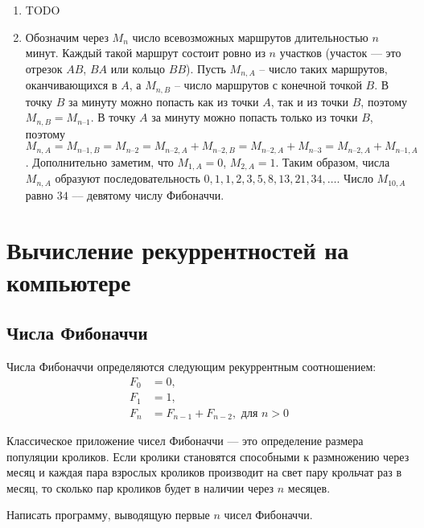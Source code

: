 \documentclass[14pt,openany]{book}
\begin{document}
\begin{enumerate}
\item TODO

\item   Обозначим через $M_n$ число всевозможных маршрутов длительностью $n$ минут. Каждый такой маршрут состоит ровно из $n$ участков (участок –-- это отрезок $AB$, $BA$ или кольцо $BB$). Пусть  $M_{n,A}$ – число таких маршрутов, оканчивающихся в $A$, а $M_{n,B}$ – число маршрутов с конечной точкой $B$.
  В точку $B$ за минуту можно попасть как из точки $A$, так и из точки $B$, поэтому  $M_{n,B} = M_{n–1}$.
  В точку $A$ за минуту можно попасть только из точки $B$, поэтому  $M_{n,A} = M_{n–1,B} = M_{n–2} = M_{n–2,A} + M_{n–2,B} = M_{n–2,A} + M_{n–3} = M_{n–2,A} + M_{n–1,A}$. 
  Дополнительно заметим, что  $M_{1,A} = 0$, $M_{2,A} = 1$.  Таким образом, числа $M_{n,A}$ образуют последовательность  $0, 1, 1, 2, 3, 5, 8, 13, 21, 34, \ldots$.
  Число $M_{10,A}$ равно $34$ --– девятому числу Фибоначчи.


\end{enumerate}


\chapter{Вычисление рекуррентностей на компьютере}

\section{Числа Фибоначчи}

Числа Фибоначчи определяются следующим рекуррентным соотношением:
\begin{align*}
F_0 &= 0, \\
F_1 &= 1, \\
F_n &= F_{n-1} + F_{n-2}, \text{ для $n>0$}
\end{align*}

Классическое приложение чисел Фибоначчи --- это определение размера популяции кроликов.
Если кролики становятся способными к размножению через месяц и каждая пара взрослых кроликов
производит на свет пару крольчат раз в месяц, то сколько пар кроликов будет в наличии
через $n$ месяцев.

\begin{task}
Написать программу, выводящую первые $n$ чисел Фибоначчи.
\end{task}
\end{document}
